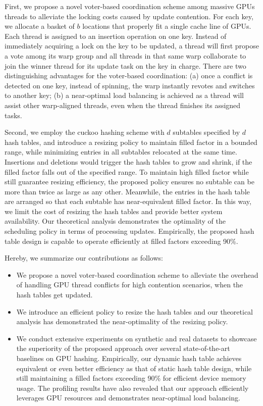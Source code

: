First, we propose a novel voter-based coordination scheme among massive GPUs threads to alleviate the locking costs caused by update contention. 
For each key, we allocate a basket of $b$ locations that properly fit a single cache line of GPUs. Each thread is assigned to an insertion operation on one key. Instead of immediately acquiring a lock on the key to be updated, a thread will first propose a vote among its warp group and all threads in that same warp collaborate to join the winner thread for its update task on the key in charge. There are two distinguishing advantages for the voter-based coordination: (a) once a conflict is detected on one key, instead of spinning, the warp instantly revotes and switches to another key; (b) a near-optimal load balancing is achieved as a thread will assist other warp-aligned threads, even when the thread finishes its assigned tasks.

Second, we employ the cuckoo hashing scheme with $d$ subtables specified by $d$ hash tables, and introduce a resizing policy to maintain filled factor in a bounded range, while minimizing entries in all subtables relocated at the same time. Insertions and deletions would trigger the hash tables to grow and shrink, if the filled factor falls out of the specified range. To maintain high filled factor while still guarantee resizing efficiency, the proposed policy ensures no subtable can be more than twice as large as any other. Meanwhile, the entries in the hash table are arranged so that each subtable has near-equivalent filled factor.
 In this way, we limit the cost of resizing the hash tables and provide better system availability.
Our theoretical analysis demonstrates the optimality of the scheduling policy in terms of processing updates. 
Empirically, the proposed hash table design is capable to operate efficiently at filled factors exceeding 90\%.

Hereby, we summarize our contributions as follows:
\begin{itemize}
	\item We propose a novel voter-based coordination scheme to alleviate the overhead of handling GPU thread conflicts for high contention scenarios, when the hash tables get updated.  
	\item We introduce an efficient policy to resize the hash tables and our theoretical analysis has demonstrated the near-optimality of the resizing policy.
	\item We conduct extensive experiments on synthetic and real datasets to showcase the superiority of the proposed approach over several state-of-the-art baselines on GPU hashing. Empirically, our dynamic hash table achieves equivalent or even better efficiency as that of static hash table design, while still maintaining a filled factors exceeding 90\% for efficient device memory usage. The profiling results have also revealed that our approach efficiently leverages GPU resources and demonstrates near-optimal load balancing. 
\end{itemize}

